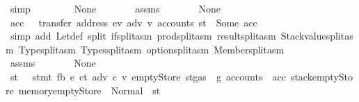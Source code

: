 \begin{isabellebody}
\ simp\isanewline
\ \ \isamarkupfalse%
\isanewline
\ \ \ \ \isamarkupfalse%
\ None\isanewline
\ \ \ \ \isamarkupfalse%
\ \isamarkupfalse%
\ assms\ {}\ {}\ {}\ {}\ {}\ {}\ {}\ None\ \isamarkupfalse%
\ acc\ \ {}{\isacharcolon}{\kern0pt}\ {\isachardoublequoteopen}transfer\ {\isacharparenleft}{\kern0pt}address\ ev{\isacharparenright}{\kern0pt}\ adv\ v{\isacharprime}{\kern0pt}\ {\isacharparenleft}{\kern0pt}accounts\ st{\isacharparenright}{\kern0pt}\ {\isacharequal}{\kern0pt}\ Some\ acc{\isachardoublequoteclose}\ \isamarkupfalse%
\ {\isacharparenleft}{\kern0pt}simp\ add{\isacharcolon}{\kern0pt}\ Let{\isacharunderscore}{\kern0pt}def\ split{\isacharcolon}{\kern0pt}\ if{\isacharunderscore}{\kern0pt}split{\isacharunderscore}{\kern0pt}asm\ prod{\isachardot}{\kern0pt}split{\isacharunderscore}{\kern0pt}asm\ result{\isachardot}{\kern0pt}split{\isacharunderscore}{\kern0pt}asm\ Stackvalue{\isachardot}{\kern0pt}split{\isacharunderscore}{\kern0pt}asm\ Type{\isachardot}{\kern0pt}split{\isacharunderscore}{\kern0pt}asm\ Types{\isachardot}{\kern0pt}split{\isacharunderscore}{\kern0pt}asm\ option{\isachardot}{\kern0pt}split{\isacharunderscore}{\kern0pt}asm\ Member{\isachardot}{\kern0pt}split{\isacharunderscore}{\kern0pt}asm{\isacharparenright}{\kern0pt}\isanewline
\ \ \ \ \isamarkupfalse%
\ \isamarkupfalse%
\ assms\ {}\ {}\ {}\ {}\ {}\ {}\ {}\ None\ {}\ \isamarkupfalse%
\ st{\isacharprime}{\kern0pt}{\isacharprime}{\kern0pt}\ \ {}{\isacharcolon}{\kern0pt}\ {\isachardoublequoteopen}stmt\ fb{\isacharprime}{\kern0pt}\ {\isacharparenleft}{\kern0pt}e{\isacharprime}{\kern0pt}\ ct\ adv\ c\ v{\isacharprime}{\kern0pt}{\isacharparenright}{\kern0pt}\ emptyStore\ {\isacharparenleft}{\kern0pt}st{\isasymlparr}gas\ {\isacharcolon}{\kern0pt}{\isacharequal}{\kern0pt}\ g{\isacharprime}{\kern0pt}{\isacharcomma}{\kern0pt}\ accounts\ {\isacharcolon}{\kern0pt}{\isacharequal}{\kern0pt}\ acc{\isacharcomma}{\kern0pt}\ stack{\isacharcolon}{\kern0pt}{\isacharequal}{\kern0pt}emptyStore{\isacharcomma}{\kern0pt}\ memory{\isacharcolon}{\kern0pt}{\isacharequal}{\kern0pt}emptyStore{\isasymrparr}{\isacharparenright}{\kern0pt}\ {\isacharequal}{\kern0pt}\ Normal\ {\isacharparenleft}{\kern0pt}{\isacharparenleft}{\kern0pt}{\isacharparenright}{\kern0pt}{\isacharcomma}{\kern0pt}\ st{\isacharprime}{\kern0pt}{\isacharprime}{\kern0pt}{\isacharparenright}{\kern0pt}{\isachardoublequoteclose}\ \isamarkupfalse%

\end{isabellebody}
